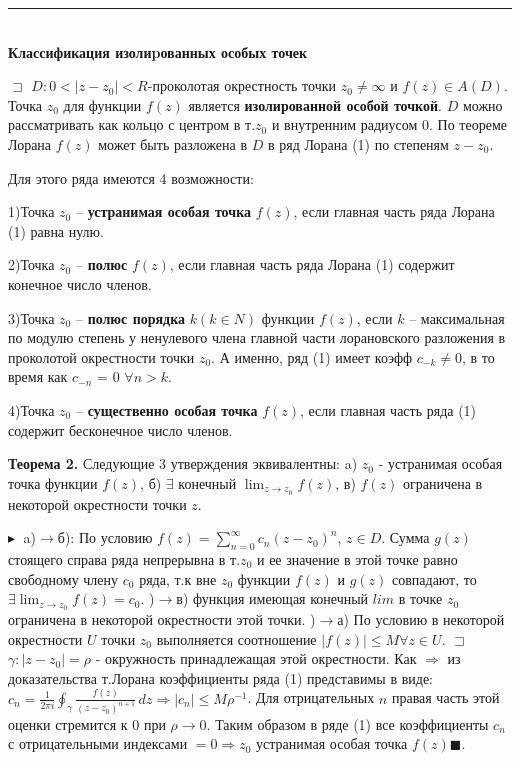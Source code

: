 \rule{275pt}{0.5pt} \\
\textbf{ \large Классификация изолиpованных особых точек}

$\sqsupset$ $D:0<|z-z_0|<R$-проколотая окрестность точки $z_0\neq\infty$ и $f(z) \in A(D)$. Точка $z_0$ для функции $f(z)$ является \textbf{изолированной особой точкой}. $D$ можно рассматривать как кольцо с центром в т.$z_0$ и внутренним радиусом 0. По теореме Лорана $f(z)$ может быть разложена в $D$ в ряд Лорана (1) по степеням $z-z_0$.

Для этого ряда имеются 4 возможности:

    1)Точка $z_0$ – \textbf{устранимая особая точка} $f(z)$, если главная часть ряда Лорана (1) равна нулю.
    
    2)Точка $z_0$ – \textbf{полюс} $f(z)$, если главная часть ряда Лорана (1) содержит конечное число членов.   
    
    3)Точка $z_0$ – \textbf{полюс порядка} $k (k \in N)$ функции $f(z)$, если $k$
– максимальная по модулю степень у ненулевого члена главной части лорановского разложения в проколотой окрестности точки $z_0$. А именно, ряд (1) имеет коэфф $c_{-k}\neq 0$,
в то время как $c_{-n}$ = 0 $\forall n > k$.

    4)Точка $z_0$ – \textbf{существенно особая точка} $f(z)$, если
главная часть ряда (1) содержит бесконечное число членов.

\textbf{Теорема 2.} Следующие 3 утверждения эквивалентны: a) $z_0$ - устранимая особая точка функции $f(z)$, б) $\exists$ конечный $\displaystyle\lim_{z\rightarrow z_0}f(z)$, в) $f(z)$ ограничена в некоторой окрестности точки $z$.

$\blacktriangleright\;$
    a)$\rightarrow$б): По условию $f(z)=\sum_{n=0}^{\infty}c_n(z-z_0)^n$, $z \in D$. Сумма $g(z)$ стоящего справа ряда непрерывна в т.$z_0$ и ее значение в этой точке равно свободному члену $c_0$ ряда, т.к вне $z_0$ функции $f(z)$ и $g(z)$ совпадают, то $\exists \displaystyle\lim_{z\rightarrow z_0}f(z)=c_0$.
    )$\rightarrow$в) функция имеющая конечный $lim$ в точке $z_0$ ограничена в некоторой окрестности этой точки.
    )$\rightarrow$а) По условию в некоторой окрестности $U$ точки $z_0$ выполняется соотношение $|f(z)|\leq M \forall z \in U$. $\sqsupset$ $\gamma:|z-z_0|=\rho$ - окружность принадлежащая этой окрестности. Как $\Rightarrow$ из доказательства т.Лорана коэффициенты ряда (1) представимы в виде: $c_n = \frac{1}{2\pi i} \oint_{\gamma} \frac{f(z)}{(z-z_0)^{n+1}} \,dz \Rightarrow |c_n|\leq M\rho^{-1}$. Для отрицательных $n$ правая часть этой оценки стремится к 0 при $\rho \rightarrow 0$. Таким образом в ряде (1) все коэффициенты $c_n$ с отрицательными индексами $=0\Rightarrow z_0$ устранимая особая точка $f(z) \blacksquare$. 
    
